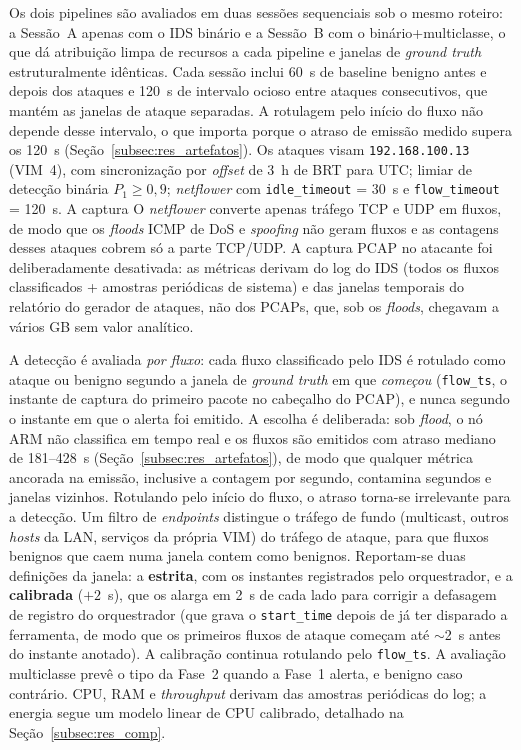 \documentclass[12pt,a4paper]{article}
\begin{document}
Os dois pipelines são avaliados em duas sessões sequenciais sob o mesmo
roteiro: a Sessão~A apenas com o IDS binário e a Sessão~B com o
binário+multiclasse, o que dá atribuição limpa de recursos a cada pipeline e
janelas de \textit{ground truth} estruturalmente idênticas. Cada sessão inclui
60~s de baseline benigno antes e depois dos ataques e 120~s de intervalo ocioso
entre ataques consecutivos, que mantém as janelas de ataque separadas. A
rotulagem pelo início do fluxo não depende desse intervalo, o que importa porque
o atraso de emissão medido supera os 120~s (Seção~\ref{subsec:res_artefatos}).
Os ataques visam
\texttt{192.168.100.13} (VIM~4), com sincronização por \textit{offset} de 3~h de
BRT para UTC; limiar de detecção binária $P_1 \geq 0{,}9$; \textit{netflower}
com \texttt{idle\_timeout} = 30~s e \texttt{flow\_timeout} = 120~s. A captura
O \textit{netflower} converte apenas tráfego TCP e UDP em fluxos, de modo que
os \textit{floods} ICMP de DoS e \textit{spoofing} não geram fluxos e as
contagens desses ataques cobrem só a parte TCP/UDP. A captura
PCAP no atacante foi deliberadamente desativada: as métricas derivam do log do
IDS (todos os fluxos classificados + amostras periódicas de sistema) e das janelas temporais do
relatório do gerador de ataques, não dos PCAPs, que, sob os \textit{floods},
chegavam a vários GB sem valor analítico.

A detecção é avaliada \emph{por fluxo}: cada fluxo classificado pelo IDS é
rotulado como ataque ou benigno segundo a janela de \textit{ground truth} em que
\emph{começou} (\texttt{flow\_ts}, o instante de captura do primeiro pacote no
cabeçalho do PCAP), e nunca segundo o instante em que o alerta foi emitido. A
escolha é deliberada: sob \textit{flood}, o nó ARM não classifica em tempo real e
os fluxos são emitidos com atraso mediano de 181--428~s
(Seção~\ref{subsec:res_artefatos}), de modo que qualquer métrica ancorada na
emissão, inclusive a contagem por segundo, contamina segundos e janelas vizinhos. Rotulando pelo início do fluxo, o atraso
torna-se irrelevante para a detecção. Um filtro de \textit{endpoints} distingue
o tráfego de fundo (multicast, outros \textit{hosts} da LAN, serviços da própria
VIM) do tráfego de ataque, para que fluxos benignos que caem numa janela contem
como benignos. Reportam-se duas definições da janela: a \textbf{estrita}, com os
instantes registrados pelo orquestrador, e a \textbf{calibrada} ($+2$~s), que os
alarga em 2~s de cada lado para corrigir a defasagem de registro do orquestrador
(que grava o \texttt{start\_time} depois de já ter disparado a ferramenta, de
modo que os primeiros fluxos de ataque começam até $\sim$2~s antes do instante
anotado). A calibração continua rotulando pelo \texttt{flow\_ts}. A avaliação
multiclasse prevê o tipo da Fase~2 quando a Fase~1 alerta, e benigno caso
contrário. CPU, RAM e \textit{throughput} derivam das amostras periódicas do
log; a energia segue um modelo linear de CPU calibrado, detalhado na
Seção~\ref{subsec:res_comp}.
\end{document}
